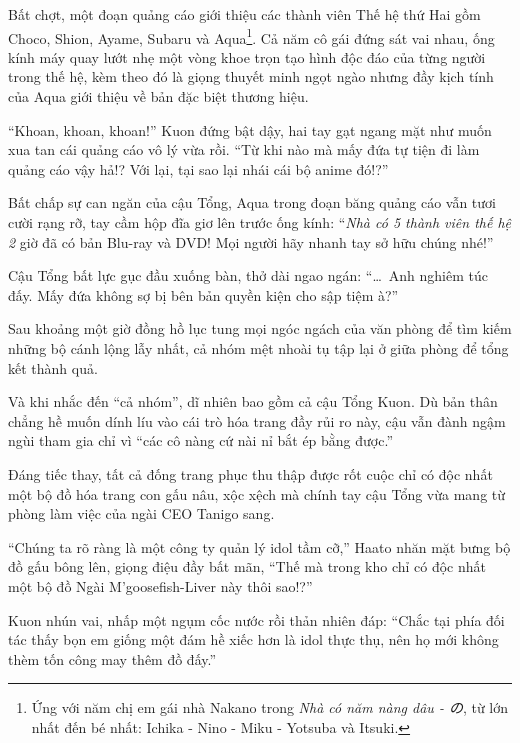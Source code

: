 \documentclass[../main.tex]{subfiles}
\begin{document}
Bất chợt, một đoạn quảng cáo giới thiệu các thành viên Thế hệ thứ Hai gồm Choco, Shion, Ayame, Subaru và Aqua\footnote{Ứng với năm chị em gái nhà Nakano trong \textit{Nhà có năm nàng dâu - の}, từ lớn nhất đến bé nhất: Ichika - Nino - Miku - Yotsuba và Itsuki.}. Cả năm cô gái đứng sát vai nhau, ống kính máy quay lướt nhẹ một vòng khoe trọn tạo hình độc đáo của từng người trong thế hệ, kèm theo đó là giọng thuyết minh ngọt ngào nhưng đầy kịch tính của Aqua giới thiệu về bản đặc biệt thương hiệu.


``Khoan, khoan, khoan!'' Kuon đứng bật dậy, hai tay gạt ngang mặt như muốn xua tan cái quảng cáo vô lý vừa rồi. ``Từ khi nào mà mấy đứa tự tiện đi làm quảng cáo vậy hả!? Với lại, tại sao lại nhái cái bộ anime đó!?''

Bất chấp sự can ngăn của cậu Tổng, Aqua trong đoạn băng quảng cáo vẫn tươi cười rạng rỡ, tay cầm hộp đĩa giơ lên trước ống kính: ``\textit{Nhà có 5 thành viên thế hệ 2} giờ đã có bản Blu-ray và DVD! Mọi người hãy nhanh tay sở hữu chúng nhé!''

Cậu Tổng bất lực gục đầu xuống bàn, thở dài ngao ngán: ``\dots\ Anh nghiêm túc đấy. Mấy đứa không sợ bị bên bản quyền kiện cho sập tiệm à?''

\ct

Sau khoảng một giờ đồng hồ lục tung mọi ngóc ngách của văn phòng để tìm kiếm những bộ cánh lộng lẫy nhất, cả nhóm mệt nhoài tụ tập lại ở giữa phòng để tổng kết thành quả.

Và khi nhắc đến ``cả nhóm'', dĩ nhiên bao gồm cả cậu Tổng Kuon. Dù bản thân chẳng hề muốn dính líu vào cái trò hóa trang đầy rủi ro này, cậu vẫn đành ngậm ngùi tham gia chỉ vì ``các cô nàng cứ nài nỉ bắt ép bằng được.''

Đáng tiếc thay, tất cả đống trang phục thu thập được rốt cuộc chỉ có độc nhất một bộ đồ hóa trang con gấu nâu, xộc xệch mà chính tay cậu Tổng vừa mang từ phòng làm việc của ngài CEO Tanigo sang.

``Chúng ta rõ ràng là một công ty quản lý idol tầm cỡ,'' Haato nhăn mặt bưng bộ đồ gấu bông lên, giọng điệu đầy bất mãn, ``Thế mà trong kho chỉ có độc nhất một bộ đồ Ngài M'goosefish-Liver này thôi sao!?''

Kuon nhún vai, nhấp một ngụm cốc nước rồi thản nhiên đáp: ``Chắc tại phía đối tác thấy bọn em giống một đám hề xiếc hơn là idol thực thụ, nên họ mới không thèm tốn công may thêm đồ đấy.''
\end{document}
